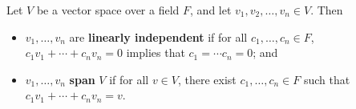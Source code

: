 \begin{definition}
Let $V$ be a vector space over a field $F$, and let $v_1, v_2, \ldots,v_n\in V$. Then
\begin{itemize}
\item $v_1, \ldots,v_n$ are \textbf{linearly independent} if for all $c_1, \ldots,c_n\in F$, $c_1v_1+ \cdots + c_nv_n = 0$ implies that $c_1  = \cdots c_n = 0$; and
\item $v_1, \ldots,v_n$ \textbf{span} $V$ if for all $v\in V$, there exist $c_1,  \ldots,c_n\in F$ such that $c_1v_1+ \cdots + c_nv_n = v$.
\end{itemize}
\end{definition}






